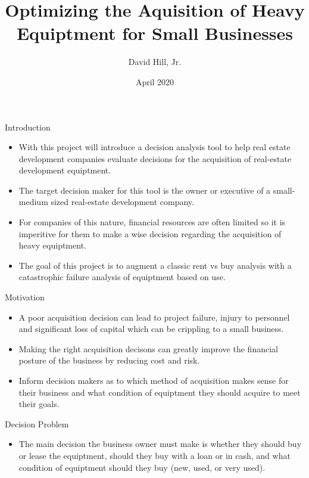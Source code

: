 \documentclass[
  ignorenonframetext,
]{beamer}
\title{Optimizing the Aquisition of Heavy Equiptment for Small
Businesses}
\author{David Hill, Jr.}
\date{April 2020}
\providecommand{\tightlist}{%
  \setlength{\itemsep}{0pt}\setlength{\parskip}{0pt}}
\begin{document}
\frame{\titlepage}

\begin{frame}{Introduction}
\protect\hypertarget{introduction}{}
\begin{itemize}
\item
  With this project will introduce a decision analysis tool to help real
  estate development companies evaluate decisions for the acquisition of
  real-estate development equiptment.
\item
  The target decision maker for this tool is the owner or executive of a
  small-medium sized real-estate development company.
\item
  For companies of this nature, financial resources are often limited so
  it is imperitive for them to make a wise decision regarding the
  acquisition of heavy equiptment.
\item
  The goal of this project is to augment a classic rent vs buy analysis
  with a catastrophic failure analysis of equiptment based on use.
\end{itemize}
\end{frame}

\begin{frame}{Motivation}
\protect\hypertarget{motivation}{}
\begin{itemize}
\item
  A poor acquisition decision can lead to project failure, injury to
  personnel and significant loss of capital which can be crippling to a
  small business.
\item
  Making the right acquisition decisons can greatly improve the
  financial posture of the business by reducing cost and risk.
\item
  Inform decision makers as to which method of acquisition makes sense
  for their business and what condition of equiptment they should
  acquire to meet their goals.
\end{itemize}
\end{frame}

\begin{frame}{Decision Problem}
\protect\hypertarget{decision-problem}{}
\begin{itemize}
\tightlist
\item
  The main decision the business owner must make is whether they should
  buy or lease the equiptment, should they buy with a loan or in cash,
  and what condition of equiptment should they buy (new, used, or very
  used).
\end{itemize}
\end{frame}
\end{document}
